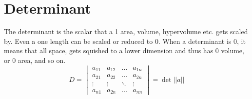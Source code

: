 \section{Determinant}
The determinant is the scalar that a 1 area, volume, hypervolume etc. gets scaled by. Even a one length can be scaled or reduced to 0. When a determinant is 0, it means that all space, gets squished to a lower dimension and thus has 0 volume, or 0 area, and so on.
\[D = 
\begin{vmatrix}
a_{11} & a_{12} & \dots & a_{1n}\\
a_{21} & a_{22} & \dots & a_{2n}\\
\vdots & \vdots & \ddots & \vdots \\
a_{n1} & a_{2n} & \dots & a_{nn}
\end{vmatrix} = \det||a||
\]
